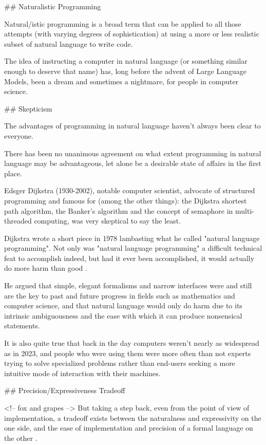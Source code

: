 ## Naturalistic Programming

Natural/istic programming is a broad term that can be applied to all those attempts (with varying degrees of sophistication) at using a more or less realistic subset of natural language to write code.

The idea of instructing a computer in natural language (or something similar enough to deserve that name) has, long before the advent of Large Language Models, been a dream and sometimes a nightmare, for people in computer science.

## Skepticism

The advantages of programming in natural language haven't always been clear to everyone.

There has been no unanimous agreement on what extent programming in natural language may be advantageous, let alone be a desirable state of affairs in the first place.

Edsger Dijkstra (1930-2002), notable computer scientist, advocate of structured programming and famous for (among the other things): the Dijkstra shortest path algorithm, the Banker's algorithm and the concept of semaphore in multi-threaded computing, was very skeptical to say the least.

Dijkstra wrote a short piece in 1978 lambasting what he called "natural language programming". Not only was "natural language programming" a difficult technical feat to accomplish indeed, but had it ever been accomplished, it would actually do more harm than good \cite{foolishnessnatprogramming}.

He argued that simple, elegant formalisms and narrow interfaces were and still are the key to past and future progress in fields such as mathematics and computer science, and that natural language would only do harm due to its intrinsic ambiguousness and the ease with which it can produce nonsensical statements. 

It is also quite true that back in the day computers weren't nearly as widespread as in 2023, and people who were using them were more often than not experts trying to solve specialized problems rather than end-users seeking a more intuitive mode of interaction with their machines.

## Precision/Expressiveness Tradeoff

<!-- fox and grapes -->
But taking a step back, even from the point of view of implementation, a tradeoff exists between the naturalness and expressivity on the one side, and the ease of implementation and precision of a formal language on the other \cite{kuhn2014survey}.

